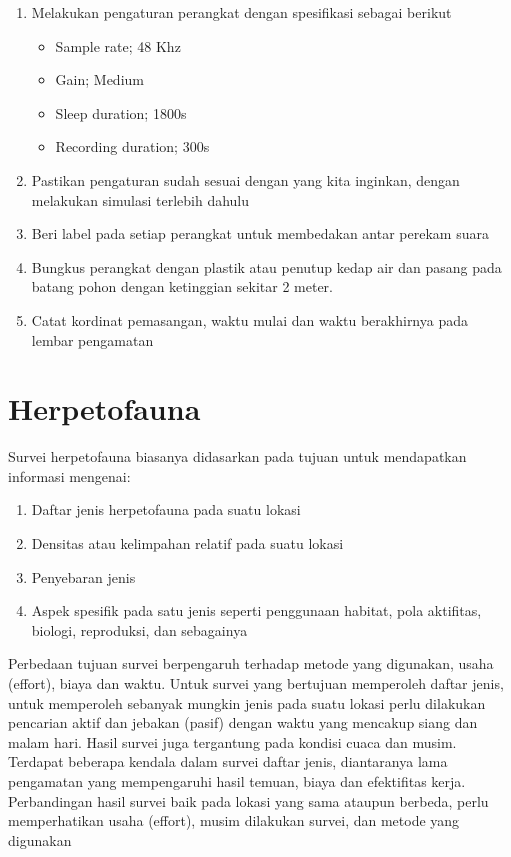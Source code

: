 \documentclass[
  oneside]{book}
\providecommand{\tightlist}{%
  \setlength{\itemsep}{0pt}\setlength{\parskip}{0pt}}
\begin{document}
\begin{enumerate}
\def\labelenumi{\arabic{enumi}.}
\item
  Melakukan pengaturan perangkat dengan spesifikasi sebagai berikut

  \begin{itemize}
  \tightlist
  \item
    Sample rate; 48 Khz
  \item
    Gain; Medium
  \item
    Sleep duration; 1800s
  \item
    Recording duration; 300s
  \end{itemize}
\item
  Pastikan pengaturan sudah sesuai dengan yang kita inginkan, dengan melakukan simulasi terlebih dahulu
\item
  Beri label pada setiap perangkat untuk membedakan antar perekam suara
\item
  Bungkus perangkat dengan plastik atau penutup kedap air dan pasang pada batang pohon dengan ketinggian sekitar 2 meter.
\item
  Catat kordinat pemasangan, waktu mulai dan waktu berakhirnya pada lembar pengamatan
\end{enumerate}

\hypertarget{herpetofauna}{%
\section*{Herpetofauna}\label{herpetofauna}}

Survei herpetofauna biasanya didasarkan pada tujuan untuk mendapatkan informasi mengenai:

\begin{enumerate}
\def\labelenumi{\arabic{enumi}.}
\tightlist
\item
  Daftar jenis herpetofauna pada suatu lokasi
\item
  Densitas atau kelimpahan relatif pada suatu lokasi
\item
  Penyebaran jenis
\item
  Aspek spesifik pada satu jenis seperti penggunaan habitat, pola aktifitas, biologi, reproduksi, dan sebagainya
\end{enumerate}

Perbedaan tujuan survei berpengaruh terhadap metode yang digunakan, usaha (effort), biaya dan waktu. Untuk survei yang bertujuan memperoleh daftar jenis, untuk memperoleh sebanyak mungkin jenis pada suatu lokasi perlu dilakukan pencarian aktif dan jebakan (pasif) dengan waktu yang mencakup siang dan malam hari. Hasil survei juga tergantung pada kondisi cuaca dan musim. Terdapat beberapa kendala dalam survei daftar jenis, diantaranya lama pengamatan yang mempengaruhi hasil temuan, biaya dan efektifitas kerja. Perbandingan hasil survei baik pada lokasi yang sama ataupun berbeda, perlu memperhatikan usaha (effort), musim dilakukan survei, dan metode yang digunakan
\end{document}

